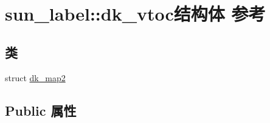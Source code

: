 \hypertarget{structsun__label_1_1dk__vtoc}{}\section{sun\+\_\+label\+:\+:dk\+\_\+vtoc结构体 参考}
\label{structsun__label_1_1dk__vtoc}
\subsection*{类}
\begin{DoxyCompactItemize}
\item 
struct \hyperlink{structsun__label_1_1dk__vtoc_1_1dk__map2}{dk\+\_\+map2}
\end{DoxyCompactItemize}
\subsection*{Public 属性}

